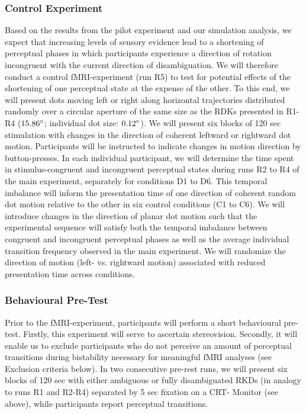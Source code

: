 \documentclass[12pt]{article}
\begin{document}
\subsubsection{Control Experiment}
Based on the results from the pilot experiment and our simulation analysis, we expect that increasing levels of sensory evidence lead to a shortening of perceptual phases in which participants experience a direction of rotation incongruent with the current direction of disambiguation. We will therefore conduct a control fMRI-experiment (run R5) to test for potential effects of the shortening of one perceptual state at the expense of the other. To this end, we will present dots moving left or right along horizontal trajectories distributed randomly over a circular aperture of the same size as the RDKs presented in R1-R4 ($15.86\degree$; individual dot size: $0.12\degree$). We will present six blocks of 120 sec stimulation with changes in the direction of coherent leftward or rightward dot motion. Participants will be instructed to indicate changes in motion direction by button-presses. In each individual participant, we will determine the time spent in stimulus-congruent and incongruent perceptual states during runs R2 to R4 of the main experiment, separately for conditions D1 to D6. This temporal imbalance will inform the presentation time of one direction of coherent random dot motion relative to the other in six control conditions (C1 to C6). We will introduce changes in the direction of planar dot motion such that the experimental sequence will satisfy both the temporal imbalance between congruent and incongruent perceptual phases as well as the average individual transition frequency observed in the main experiment. We will randomize the direction of motion (left- vs. rightward motion) associated with reduced presentation time across conditions.  

\subsubsection{Behavioural Pre-Test}
Prior to the fMRI-experiment, participants will perform a short behavioural pre-test. Firstly, this experiment will serve to ascertain stereovision. Secondly, it will enable us to exclude participants who do not perceive an amount of perceptual transitions during bistability necessary for meaningful fMRI analyses (see Exclusion criteria below). In two consecutive pre-rest runs, we will present six blocks of 120 sec with either ambiguous or fully disambiguated RKDs (in analogy to runs R1 and R2-R4) separated by 5 sec fixation on a CRT- Monitor (see above), while participants report perceptual transitions.  
\end{document}
